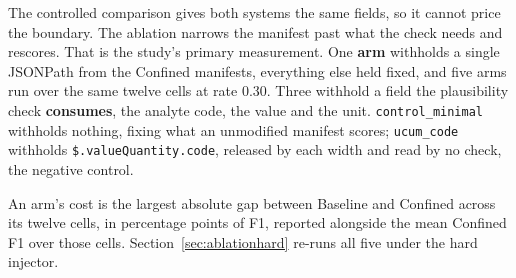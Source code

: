 
The controlled comparison gives both systems the same fields, so it cannot price the boundary. The
ablation narrows the manifest past what the check needs and rescores. That is the study's primary
measurement. One \textbf{arm} withholds a single JSONPath from the Confined manifests, everything
else held fixed, and five arms run over the same twelve cells at rate 0.30. Three withhold a field
the plausibility check \textbf{consumes}, the analyte code, the value and the unit.
\texttt{control\_minimal} withholds nothing, fixing what an unmodified manifest scores;
\texttt{ucum\_code} withholds \texttt{\$.valueQuantity.code}, released by each width and read by no
check, the negative control.

An arm's cost is the largest absolute gap between Baseline and Confined across its twelve cells, in
percentage points of F1, reported alongside the mean Confined F1 over those cells.
Section~\ref{sec:ablationhard} re-runs all five under the hard injector.
